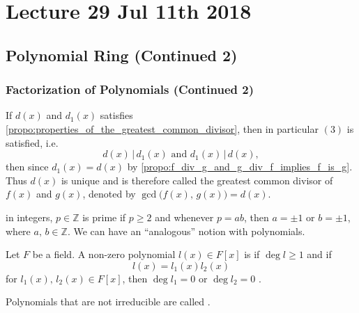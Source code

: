 \chapter{Lecture 29 Jul 11th 2018}%
\label{chp:lecture_29_jul_11th_2018}

\section{Polynomial Ring (Continued 2)}%
\label{sec:polynomial_ring_continued_2}

\subsection{Factorization of Polynomials (Continued 2)}%
\label{sub:factorization_of_polynomials_continued_2}

\begin{note}
  If $d(x)$ and $d_1(x)$ satisfies \cref{propo:properties_of_the_greatest_common_divisor}, then in particular $(3)$ is satisfied, i.e.
  \begin{equation*}
    d(x) \, | \, d_1(x) \text{ and } d_1(x) \, | \, d(x),
  \end{equation*}
  then since $d_1(x) = d(x)$ by \cref{propo:f_div_g_and_g_div_f_implies_f_is_g}. Thus $d(x)$ is unique and is therefore called the greatest common divisor of $f(x)$ and $g(x)$, denoted by $\gcd\Big( f(x), \, g(x) \Big) = d(x)$.
\end{note}

 in integers, $p \in \mathbb{Z}$ is prime if $p \geq 2$ and whenever $p = ab$, then $a = \pm 1$ or $b = \pm 1$, where $a, \, b \in \mathbb{Z}$. We can have an ``analogous'' notion with polynomials.

\begin{defn}
\label{defn:irreducible_polynomials}
  Let $F$ be a field. A non-zero polynomial $l(x) \in F[x]$ is  if $\deg l \geq 1$ and if
  \begin{equation*}
    l(x) = l_1 (x) l_2 (x)
  \end{equation*}
  for $l_1(x), \, l_2 (x) \in F[x]$, then $\deg l_1 = 0$ or $\deg l_2 = 0$ .

  Polynomials that are not irreducible are called .
\end{defn}

